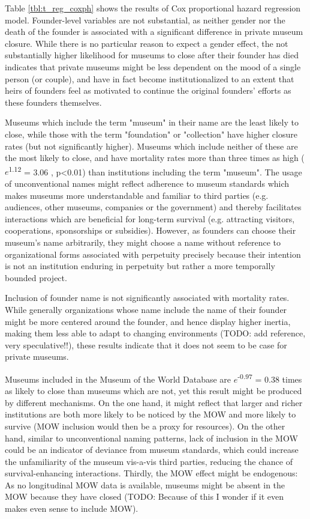 \documentclass[11pt]{article}
\begin{document}
Table \ref{tbl:t_reg_coxph} shows the results of Cox proportional hazard regression model.
Founder-level variables are not substantial, as neither gender nor the death of the founder is associated with a significant difference in private museum closure.
While there is no particular reason to expect a gender effect, the not substantially higher likelihood for museums to close after their founder has died indicates that private museums might be less dependent on the mood of a single person (or couple), and have in fact become institutionalized to an extent that heirs of founders feel as motivated to continue the original founders' efforts as these founders themselves.


Museums which include the term "museum" in their name are the least likely to close, while those with the term "foundation" or "collection" have higher closure rates (but not significantly higher).
Museums which include neither of these are the most likely to close, and have mortality rates more than three times as high (\(e\)\textsuperscript{1.12} = 3.06 , p<0.01) than institutions including the term "museum".
The usage of unconventional names might reflect adherence to museum standards which makes museums more understandable and familiar to third parties (e.g. audiences, other museums, companies or the government) and thereby facilitates interactions which are beneficial for long-term survival (e.g. attracting visitors, cooperations, sponsorships or subsidies).
However, as founders can choose their museum’s name arbitrarily, they might choose a name without reference to organizational forms associated with perpetuity precisely because their intention is not an institution enduring in perpetuity but rather a more temporally bounded project.

Inclusion of founder name is not significantly associated with mortality rates.
While generally organizations whose name include the name of their founder might be more centered around the founder, and hence display higher inertia, making them less able to adapt to changing environments (TODO: add reference, very speculative!!), these results indicate that it does not seem to be case for private museums.


Museums included in the Museum of the World Database are \(e\)\textsuperscript{-0.97} = 0.38 times as likely to close than museums which are not, yet this result might be produced by different mechanisms.
On the one hand, it might reflect that larger and richer institutions are both more likely to be noticed by the MOW and more likely to survive (MOW inclusion would then be a proxy for resources).
On the other hand, similar to unconventional naming patterns, lack of inclusion in the MOW could be an indicator of deviance from museum standards, which could increase the unfamiliarity of the museum vis-a-vis third parties, reducing the chance of survival-enhancing interactions.
Thirdly, the MOW effect might be endogenous: As no longitudinal MOW data is available, museums might be absent in the MOW because they have closed (TODO: Because of this I wonder if it even makes even sense to include MOW).
\end{document}
